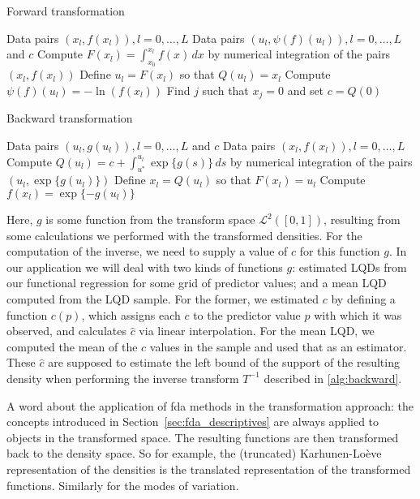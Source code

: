 \begin{algorithm}
    \caption{Forward transformation}
    \label{alg:forward}
    \begin{algorithmic}[1]
    \Require Data pairs \( (x_l, f(x_l)), l = 0, \ldots, L \)
    \Ensure Data pairs \( (u_l, \psi(f)(u_l)), l = 0, \ldots, L \) and \( c \)
        \State Compute \( F(x_l) = \int_{x_0}^{x_l} f(x) \, dx \) by numerical integration of the pairs \( (x_l, f(x_l)) \)
        \State Define \( u_l = F(x_l) \) so that \( Q(u_l) = x_l \)
        \State Compute \( \psi(f)(u_l) = -\ln(f(x_l)) \)
        \State Find \( j \) such that \( x_j = 0 \) and set \( c = Q(0) \)
    \EndFor
    \end{algorithmic}
\end{algorithm}

\begin{algorithm}
    \caption{Backward transformation}
    \label{alg:backward}
    \begin{algorithmic}[1]
    \Require Data pairs \( (u_l, g(u_l)), l = 0, \ldots, L \) and \( c \)
    \Ensure Data pairs \( (x_l, f(x_l)), l = 0, \ldots, L \)
        \State Compute \( Q(u_l) = c + \int_{u^*}^{u_l} \exp\{g(s)\} \, ds \) by numerical integration of the pairs \( (u_l, \exp\{g(u_l)\}) \)
        \State Define \( x_l = Q(u_l) \) so that \( F(x_l) = u_l \)
        \State Compute \( f(x_l) = \exp \{-g(u_l)\} \)
    \EndFor
    \end{algorithmic}
\end{algorithm}

Here, $g$ is some function from the transform space $\mathcal{L}^2([0,1])$,
resulting from some calculations we performed with the transformed densities. For
the computation of the inverse, we need to supply a value of $c$ for this function $g$.
In our application we will deal with two kinds of functions $g$: estimated LQDs from
our functional regression for some grid of predictor values; and a mean LQD computed from
the LQD sample. For the former, we estimated $c$ by defining a function $c(p)$, which
assigns each $c$ to the predictor value $p$ with which it was observed, and calculates $\hat{c}$
via linear interpolation. For the mean LQD, we computed the mean of the $c$ values in the sample
and used that as an estimator. These $\hat{c}$ are supposed to estimate the left bound
of the support of the resulting density when performing the inverse transform $T^{-1}$
described in \ref{alg:backward}.

A word about the application of fda methods in the transformation approach: the concepts
introduced in Section~\ref{sec:fda_descriptives} are always applied to objects in the
transformed space. The resulting functions are then transformed back to the density
space. So for example, the (truncated) Karhunen-Loève representation of the densities is the
translated representation of the transformed functions. Similarly for the modes of variation.


